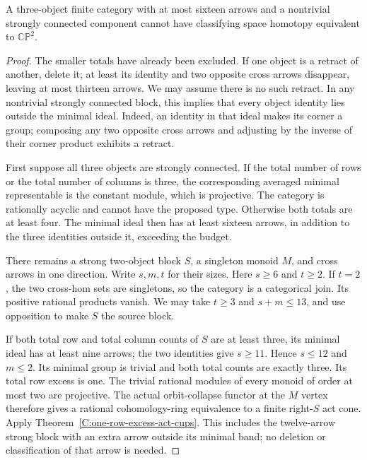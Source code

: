 \begin{theorem}
\label{C:sixteen-three-SCC}
A three-object finite category with at most sixteen arrows
and a nontrivial strongly connected component cannot have
classifying space homotopy equivalent to $\mathbb {CP}^2$.
\end{theorem}
\begin{proof}
The smaller totals have already been excluded.  If one object
is a retract of another, delete it; at least its identity
and two opposite cross arrows disappear, leaving at most
thirteen arrows.  We may assume there is no such retract.
In any nontrivial strongly connected block, this implies
that every object identity lies outside the minimal ideal.
Indeed, an identity in that ideal makes its corner a group;
composing any two opposite cross arrows and adjusting by
the inverse of their corner product exhibits a retract.

First suppose all three objects are strongly connected.
If the total number of rows or the total number of columns
is three, the corresponding averaged minimal representable
is the constant module, which is projective.  The category
is rationally acyclic and cannot have the proposed type.
Otherwise both totals are at least four.  The minimal ideal
then has at least sixteen arrows, in addition to the three
identities outside it, exceeding the budget.

There remains a strong two-object block $S$, a singleton
monoid $M$, and cross arrows in one direction.  Write $s,m,t$
for their sizes.  Here $s\geq6$ and $t\geq2$.
If $t=2$, the two cross-hom sets are singletons, so the
category is a categorical join.  Its positive rational
products vanish.  We may take $t\geq3$ and $s+m\leq13$,
and use opposition to make $S$ the source block.

If both total row and total column counts of $S$ are at
least three, its minimal ideal has at least nine arrows;
the two identities give $s\geq11$.  Hence $s\leq12$ and
$m\leq2$.  Its minimal group is trivial and both total
counts are exactly three.  Its total row excess is one.
The trivial rational modules of every monoid of order at
most two are projective.  The actual orbit-collapse functor
at the $M$ vertex therefore gives a rational cohomology-ring
equivalence to a finite right-$S$ act cone.  Apply
Theorem~\ref{C:one-row-excess-act-cups}.  This includes the
twelve-arrow strong block with an extra arrow outside its
minimal band; no deletion or classification of that arrow
is needed.


\end{proof}

